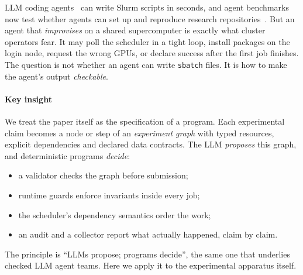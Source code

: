 \documentclass[pdflatex,sn-mathphys-num]{sn-jnl}
\theoremstyle{thmstyleone}%
\theoremstyle{thmstyletwo}%
\theoremstyle{thmstylethree}%
\newcommand{\code}[1]{\texttt{#1}}
\begin{document}
LLM coding agents~\cite{yang2024sweagent,wang2025openhands} can write Slurm
scripts in seconds, and agent benchmarks now test whether agents can set up and
reproduce research
repositories~\cite{bogin2024super,siegel2024corebench,starace2025paperbench}.
But an agent that \emph{improvises} on a shared supercomputer is exactly what
cluster operators fear. It may poll the scheduler in a tight loop, install
packages on the login node, request the wrong GPUs, or declare success after
the first job finishes. The question is not whether an agent can write
\code{sbatch} files. It is how to make the agent's output \emph{checkable}.

\paragraph{Key insight} We treat the paper itself as the specification of a
program. Each experimental claim becomes a node or step of an
\emph{experiment graph} with typed resources, explicit dependencies and
declared data contracts. The LLM \emph{proposes} this graph, and deterministic
programs \emph{decide}:
\begin{itemize}[leftmargin=1.4em, itemsep=1pt]
\item a validator checks the graph before submission;
\item runtime guards enforce invariants inside every job;
\item the scheduler's dependency semantics order the work;
\item an audit and a collector report what actually happened, claim by claim.
\end{itemize}
The principle is ``LLMs propose; programs decide'', the same one that
underlies checked LLM agent teams. Here we apply it to the experimental
apparatus itself.
\end{document}
